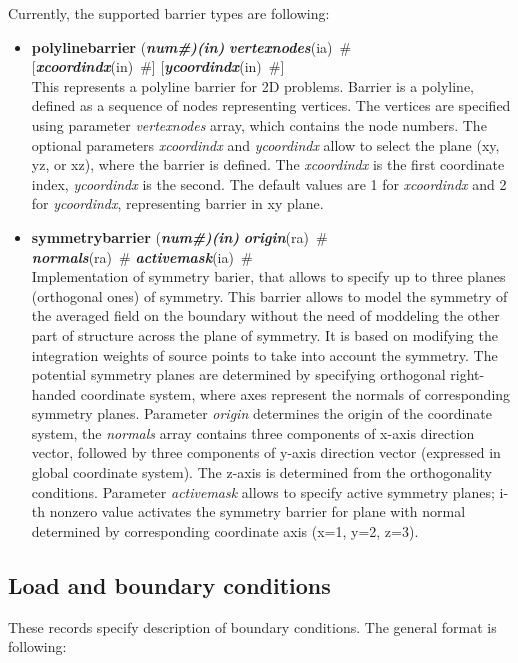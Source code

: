 \documentclass[draft]{article}
\newcommand{\param}[1]{{\em #1}}
\newcommand{\fieldVal}[2]{\mbox{({\it\bf{#1}\#)\tiny (#2)}}}
\newcommand{\keywordnotype}[1]{\mbox{{\it{\bf{#1}}}}}
\newcommand{\keyword}[2]{\mbox{{\keywordnotype{#1}\tiny (#2)}}}
\newcommand{\entKeywordInst}[1]{\mbox{{\bf{{#1}}}}}
\newcommand{\field}[2]{\mbox{\keyword{#1}{#2}~\#}}
\newcommand{\optField}[2]{\mbox{[\field{#1}{#2}]}}
\begin{document}
Currently, the supported barrier types are following:
\begin{itemize}
\item
\entKeywordInst{polylinebarrier} \fieldVal{num}{in} \field{vertexnodes}{ia}\\
\optField{xcoordindx}{in} \optField{ycoordindx}{in}\\
This represents a polyline barrier for 2D problems. Barrier is a
polyline, defined as a sequence of nodes representing vertices.
The vertices are specified using parameter \param{vertexnodes} array,
which contains the node numbers. The optional parameters
\param{xcoordindx} and \param{ycoordindx} allow to select the plane
(xy, yz, or xz), where the barrier is defined. The \param{xcoordindx} is the
first coordinate index, \param{ycoordindx} is the second. The default values
are 1 for \param{xcoordindx} and 2 for \param{ycoordindx}, representing barrier in xy plane.
\item
\entKeywordInst{symmetrybarrier}  \fieldVal{num}{in} \field{origin}{ra}\\
\field{normals}{ra} \field{activemask}{ia}\\
Implementation of symmetry barier, that allows to specify up to three planes (orthogonal ones) of symmetry.
This barrier allows to  model the symmetry of the averaged field on the boundary without 
the need of moddeling the other part of structure across the plane of symmetry.
It is based on  modifying the integration weights of source points to take into account 
the symmetry.
The potential symmetry planes are determined by specifying orthogonal right-handed coordinate system, 
where axes represent the normals of corresponding symmetry planes. 
Parameter \param{origin} determines the origin of the coordinate system, the \param{normals} array 
contains three components of x-axis direction vector, 
followed by three components of y-axis direction vector (expressed in global coordinate system).
The z-axis is determined from the orthogonality conditions.
Parameter \param{activemask} allows to specify active symmetry planes; i-th nonzero value activates the symmetry barrier for plane
with normal determined by corresponding coordinate axis (x=1, y=2, z=3).
\end{itemize}

\subsection{Load and boundary conditions}
\label{_LoadBoundaryInitialConditions}
These records specify description of  boundary conditions. The general format is
following:
\end{document}

